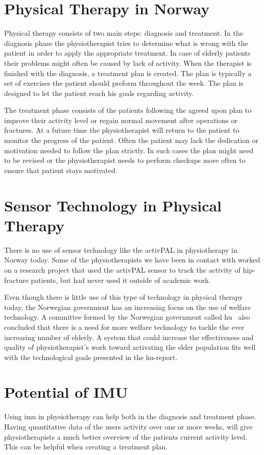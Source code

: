 \section{Physical Therapy in Norway}
Physical therapy consists of two main steps: diagnosis and treatment. In the diagnosis phase the physiotherapist tries to determine what is wrong with the patient in order to apply the appropriate treatment. In case of elderly patients their problems might often be caused by lack of activity. When the therapist is finished with the diagnosis, a treatment plan is created. The plan is typically a set of exercises the patient should preform throughout the week. The plan is designed to let the patient reach his goals regarding activity.

The treatment phase consists of the patients following the agreed upon plan to improve their activity level or regain normal movement after operations or fractures. At a future time the physiotherapist will return to the patient to monitor the progress of the patient. Often the patient may lack the dedication or motivation needed to follow the plan strictly. In such cases the plan might need to be revised or the physiotherapist needs to perform checkups more often to ensure that patient stays motivated.

\section{Sensor Technology in Physical Therapy}
There is no use of sensor technology like the activPAL in physiotherapy in Norway today. Some of the physiotherapists we have been in contact with worked on a research project that used the activPAL sensor to track the activity of hip-fracture patients, but had never used it outside of academic work.

Even though there is little use of this type of technology in physical therapy today, the Norwegian government has an increasing focus on the use of welfare technology. A committee formed by the Norwegian government called \gls{hu}~\cite{haagen} also concluded that there is a need for more welfare technology to tackle the ever increasing number of elderly. A system that could increase the effectiveness and quality of physiotherapist's work toward activating the elder population fits well with the technological goals presented in the \gls{hu}-report.  

\section{Potential of IMU}
Using \gls{imu} in physiotherapy can help both in the diagnosis and treatment phase. Having quantitative data of the users activity over one or more weeks, will give physiotherapists a much better overview of the patients current activity level. This can be helpful when creating a treatment plan.


